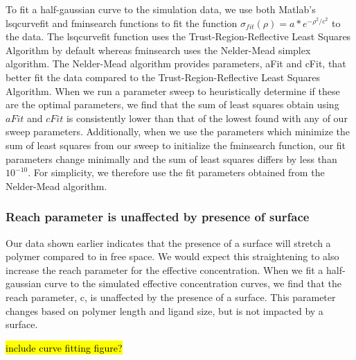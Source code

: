 \documentclass[../../AdvancementSummary.tex]{subfiles}
\begin{document}

To fit a half-gaussian curve to the simulation data, we use both Matlab's lsqcurvefit and fminsearch functions to fit the function $\sigma_{fit}(\rho) = a*e^{-\rho^2/c^2}$ to the data. The lsqcurvefit function uses the Trust-Region-Reflective Least Squares Algorithm by default whereas fminsearch uses the Nelder-Mead simplex algorithm.   The Nelder-Mead algorithm provides parameters, aFit and cFit, that better fit the data compared to the Trust-Region-Reflective Least Squares Algorithm. When we run a parameter sweep to heuristically determine if these are the optimal parameters, we find that the sum of least squares obtain using $aFit$ and $cFit$ is consistently lower than that of the lowest found with any of our sweep parameters.  Additionally, when we use the parameters which minimize the sum of least squares from our sweep to initialize the fminsearch function, our fit parameters change minimally and the sum of least squares differs by less than $10^{-10}$. For simplicity, we therefore use the fit parameters obtained from the Nelder-Mead algorithm.



\subsubsection{Reach parameter is unaffected by presence of surface}

Our data shown earlier indicates that the presence of a surface will stretch a polymer compared to in free space. We would expect this straightening to also increase the reach parameter for the effective concentration. When we fit a half-gaussian curve to the simulated effective concentration curves, we find that the reach parameter, c, is unaffected by the presence of a surface. This parameter changes based on polymer length and ligand size, but is not impacted by a surface. 


\hl{include curve fitting figure?}
\end{document}
